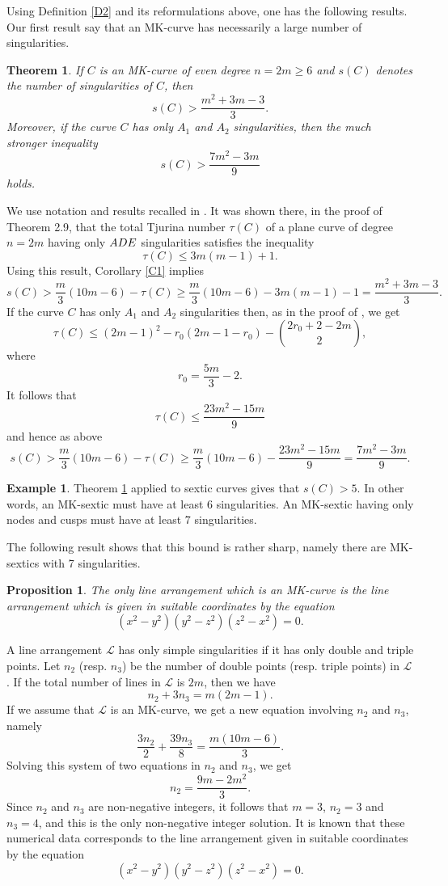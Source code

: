 \documentclass[11pt]{amsart}
\theoremstyle{plain}
\newtheorem{theorem}[thm]{Theorem}
\newtheorem{proposition}[thm]{Proposition}
\theoremstyle{definition}
\newtheorem{example}[thm]{Example}
\numberwithin{equation}{section}
\begin{document}
 

Using Definition \ref{D2} and its reformulations above, one has the following results.
Our first result say that an MK-curve has necessarily a large number of singularities.
\begin{theorem}
\label{T1}
 If $C$ is an MK-curve of even degree $n=2m\geq 6$ and $s(C)$ denotes the number of singularities of $C$, then
 $$s(C) > \frac{m^2+3m-3}{3}.$$
 Moreover, if the curve $C$ has only $A_1$ and $A_2$ singularities, then the much stronger inequality
$$s(C) > \frac{7m^2-3m}{9}$$ 
holds. 
\end{theorem}
\proof
We use notation and results recalled in \cite[Section 2]{DP}. It was shown there, in the proof of Theorem 2.9, that the total Tjurina number $\tau(C)$ of a plane curve of degree $n=2m$ having only ${\rm ADE}$ singularities satisfies the inequality
$$\tau(C) \leq 3m(m-1)+1.$$
Using this result, Corollary \ref{C1} implies
$$s(C) > \frac{m}{3}(10m-6)- \tau(C) \geq \frac{m}{3}(10m-6)-3m(m-1)-1=
\frac{m^2+3m-3}{3}.$$
If the curve $C$ has only $A_1$ and $A_2$ singularities then, as in the proof of \cite[Theorem 2.9]{DP}, we get
$$\tau(C) \leq (2m-1)^2-r_0(2m-1-r_0)- \binom{2r_0+2-2m}{2},$$
where
$$r_0=\frac{5m}{3}-2.$$
It follows that
$$\tau(C) \leq \frac{23m^2-15m}{9}$$
and hence as above
$$s(C) > \frac{m}{3}(10m-6)- \tau(C) \geq \frac{m}{3}(10m-6)-\frac{23m^2-15m}{9}=
\frac{7m^2-3m}{9}.$$

\endproof
\begin{example}
\label{E2}
Theorem \ref{T1} applied to sextic curves gives that
$s(C) >5$. In other words, an MK-sextic must have at least 6 singularities. An MK-sextic having only nodes and cusps must have at least 7 singularities.
\end{example}
The following result shows that this bound is rather sharp, namely there are MK-sextics with 7 singularities.
\begin{proposition}
\label{P1}
The only line arrangement which is an MK-curve is the line arrangement which is given in suitable coordinates by the equation
$$(x^2-y^2)(y^2-z^2)(z^2-x^2)=0.$$
\end{proposition}
\proof
A line arrangement $\mathcal{L}$ has only simple singularities if it has only double and triple points. Let $n_2$ (resp. $n_3$) be the number of double points (resp. triple points) in $\mathcal{L}$. If the total number of lines in $\mathcal{L}$ is $2m$, then we have
$$n_2+3n_3=m(2m-1).$$
If we assume that $\mathcal{L}$ is an MK-curve, we get a new equation involving $n_2$ and $n_3$, namely
$$\frac{3n_2}{2}+\frac{39n_3}{8}=\frac{m(10m-6)}{3}.$$
Solving this system of two equations in $n_2$ and $n_3$, we get
$$n_2=\frac{9m-2m^2}{3}.$$
Since $n_2$ and $n_{3}$ are non-negative integers, it follows that $m=3$, $n_2=3$ and $n_3=4$, and this is the only non-negative integer solution. It is known that these numerical data corresponds to the line arrangement given in suitable coordinates by the equation
$$(x^2-y^2)(y^2-z^2)(z^2-x^2)=0.$$
\endproof
\end{document}
